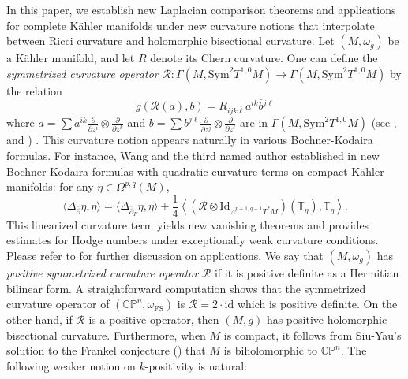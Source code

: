 \documentclass[12pt,reqno]{amsart}
\newcommand\bp{{\bar\partial}}
\theoremstyle{plain}
\theoremstyle{definition}
\newcommand{\la}{\langle}
\newcommand{\ra}{\rangle}
\newcommand{\p}{\partial}
\renewcommand{\bar}{\overline}
\newcommand{\beq}{\begin{equation}}
\newcommand{\eeq}{\end{equation}}
\renewcommand{\bp}{\bar{\partial}}
\newcommand{\Om}{\Omega}
\renewcommand{\>}{\rightarrow}
\newcommand{\C}{{\mathbb C}}
\renewcommand{\P}{{\mathbb P}}
\numberwithin{equation}{section} %
\begin{document}
In this paper, we establish new Laplacian comparison theorems and applications for complete K\"ahler manifolds under new curvature notions that interpolate between Ricci curvature and holomorphic bisectional curvature. Let $(M,\omega_g)$ be a K\"ahler manifold, and let $R$ denote its Chern curvature.
One can define the \emph{symmetrized curvature operator}  $ \mathcal {R}: \Gamma(M,\mathrm{Sym}^2 T^{1,0}M) \> \Gamma(M,\mathrm{Sym}^2 T^{1,0}M )$ by the relation \beq  g\left( \mathcal{R} \left(a\right),  b\right) = R_{i\bar j k \bar\ell} a^{ik}\bar b{}^{j\ell} \eeq where  $a=\sum a^{ik}\frac{\p}{\p z^i} \otimes \frac{\p}{\p z^k}$ and $b=\sum b^{j\ell}\frac{\p}{\p z^j} \otimes \frac{\p}{\p z^\ell}$ are in  $\Gamma(M,\mathrm{Sym}^2 T^{1,0}M)$ (see \cite{CV60}, \cite{BNPSW25} and \cite{WY25+}) . This curvature notion appears naturally in various Bochner-Kodaira formulas. For instance, Wang and the third named author established in \cite[Theorem~1.2]{WY25+} new Bochner-Kodaira  formulas with quadratic curvature terms on compact K\"ahler manifolds:  for any $\eta\in \Om^{p,q}(M)$,
\beq   \la\Delta_{\bar \p} \eta,\eta\ra =\la \Delta_{\bp_F} \eta,\eta\ra +\frac{1}{4}\left\langle \left(\mathcal {R} \otimes \mathrm{Id}_{\Lambda^{p+1,q-1}T^*M}\right)(\mathbb T_\eta),\mathbb T_\eta \right\rangle.
\eeq 
This linearized curvature term yields new vanishing theorems and provides estimates for Hodge numbers under exceptionally weak curvature conditions. Please  refer to \cite{WY25+} for further discussion on applications.  We say that  $(M,\omega_g)$ has \emph{positive symmetrized curvature operator} $\mathcal R$
if it is positive definite as a Hermitian bilinear form.
A straightforward computation shows that the symmetrized curvature operator of $(\C\P^n, \omega_{\mathrm{FS}})$ is $\mathcal R=2\cdot \mathrm{id}$ which is  positive definite. On the other hand,
if  $\mathcal {R}$ is a positive operator, then $(M,g)$ has positive holomorphic bisectional curvature. Furthermore,  when $M$ is compact,  it follows from Siu-Yau's solution to the Frankel conjecture (\cite{SY80,Mori1979}) that  $M$ is biholomorphic to $\C\P^n$. The following weaker notion on $k$-positivity is natural:
\end{document}
